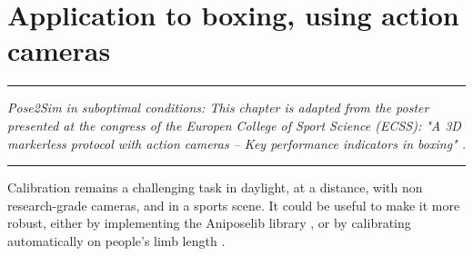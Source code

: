 
\lhead[\fancyplain{}{\leftmark}]%
      {\fancyplain{}{}} %
\chead[\fancyplain{}{}]%
      {\fancyplain{}{}}
\rhead[\fancyplain{}{}]%
      {\fancyplain{}{\rightmark}}%
\lfoot[\fancyplain{}{}]%
      {\fancyplain{}{}}
\cfoot[\fancyplain{}{\thepage}]%
      {\fancyplain{}{\thepage}} %
\rfoot[\fancyplain{}{}]%
     {\fancyplain{}{\scriptsize}}



\chapter{Application to boxing, using action cameras}
\label{ch:6}


\begin{center}
\rule{0.7\linewidth}{.5pt}
\begin{minipage}{0.7\linewidth}
\smallskip

\textit{Pose2Sim in suboptimal conditions: \newline \newline
This chapter is adapted from the poster presented at the congress of the Europen College of Sport Science (ECSS): "A 3D markerless protocol with action cameras – Key performance indicators in boxing" \cite{Pagnon2022c}.
}

\end{minipage}
\smallskip
\rule{0.7\linewidth}{.5pt}
\end{center}

\minitoc
\newpage


Calibration remains a challenging task in daylight, at a distance, with non research-grade cameras, and in a sports scene. It could be useful to make it more robust, either by implementing the Aniposelib library \cite{Karashchuk2020}, or by calibrating automatically on people’s limb length \cite{Liu2022a}.

